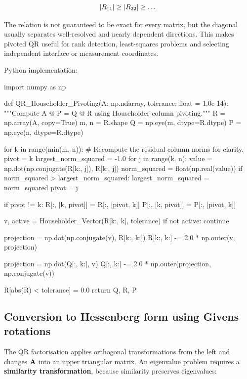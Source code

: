 \begin{equation}
    | {R_{11}} |\geq| {R_{22}} |\geq\dots
\end{equation}

The relation is not guaranteed to be exact for every matrix, but the diagonal
usually separates well-resolved and nearly dependent directions. This makes
pivoted QR useful for rank detection, least-squares problems and selecting
independent interface or measurement coordinates.

Python implementation:

\begin{python}
import numpy as np


def QR_Householder_Pivoting(A: np.ndarray,
                            tolerance: float = 1.0e-14):
    """Compute A @ P = Q @ R using Householder column pivoting."""
    R = np.array(A, copy=True)
    m, n = R.shape
    Q = np.eye(m, dtype=R.dtype)
    P = np.eye(n, dtype=R.dtype)

    for k in range(min(m, n)):
        # Recompute the residual column norms for clarity.
        pivot = k
        largest_norm_squared = -1.0
        for j in range(k, n):
            value = np.dot(np.conjugate(R[k:, j]), R[k:, j])
            norm_squared = float(np.real(value))
            if norm_squared > largest_norm_squared:
                largest_norm_squared = norm_squared
                pivot = j

        if pivot != k:
            R[:, [k, pivot]] = R[:, [pivot, k]]
            P[:, [k, pivot]] = P[:, [pivot, k]]

        v, active = Householder_Vector(R[k:, k], tolerance)
        if not active:
            continue

        projection = np.dot(np.conjugate(v), R[k:, k:])
        R[k:, k:] -= 2.0 * np.outer(v, projection)

        projection = np.dot(Q[:, k:], v)
        Q[:, k:] -= 2.0 * np.outer(projection, np.conjugate(v))

    R[abs(R) < tolerance] = 0.0
    return Q, R, P
\end{python}

\subsection{Conversion to Hessenberg form using Givens rotations}

The QR factorisation applies orthogonal transformations from the left and changes
$ \mathbf{A} $ into an upper triangular matrix. An eigenvalue problem requires a
\textbf{similarity transformation}, because similarity preserves eigenvalues:

